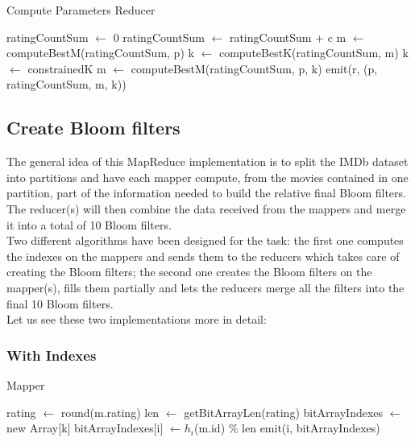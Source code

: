 \begin{algorithm}[H]
	\caption{Compute Parameters Reducer} 
	\begin{algorithmic}[1]
			\State ratingCountSum $\gets$ 0
				\State ratingCountSum $\gets$ ratingCountSum + c
			\EndFor
			 \hfill{}
				\State m $\gets$ computeBestM(ratingCountSum, p)
				\State k $\gets$ computeBestK(ratingCountSum, m)
			\Else
				\State k $\gets$ constrainedK
				\State m $\gets$ computeBestM(ratingCountSum, p, k)
			\EndIf
			\State emit(r, (p, ratingCountSum, m, k))
		\EndProcedure
	\end{algorithmic} 
\end{algorithm}

\subsection{Create Bloom filters}
The general idea of this MapReduce implementation is to split the IMDb dataset into partitions and have each mapper compute, from the movies contained in one partition, part of the information needed to build the relative final Bloom filters.
The reducer(s) will then combine the data received from the mappers and merge it into a total of 10 Bloom filters.\\
Two different algorithms have been designed for the task: the first one computes the indexes on the mappers and sends them to the reducers which takes care of creating the Bloom filters; the second one creates the Bloom filters on the mapper(s), fills them partially and lets the reducers merge all the filters into the final 10 Bloom filters.\\
Let us see these two implementations more in detail:



\subsubsection{With Indexes}
\begin{algorithm}[H]
	\caption{Mapper} 
	\begin{algorithmic}[1]
				\State rating $\gets$ round(m.rating)
				\State len $\gets$ getBitArrayLen(rating)
				\State bitArrayIndexes $\gets$ new Array[k]
					\State bitArrayIndexes[i] $\gets h_{i}$(m.id) $\%$ len
					\State emit(i, bitArrayIndexes)
				\EndFor
			\EndFor
		\EndProcedure
	\end{algorithmic} 
\end{algorithm}

